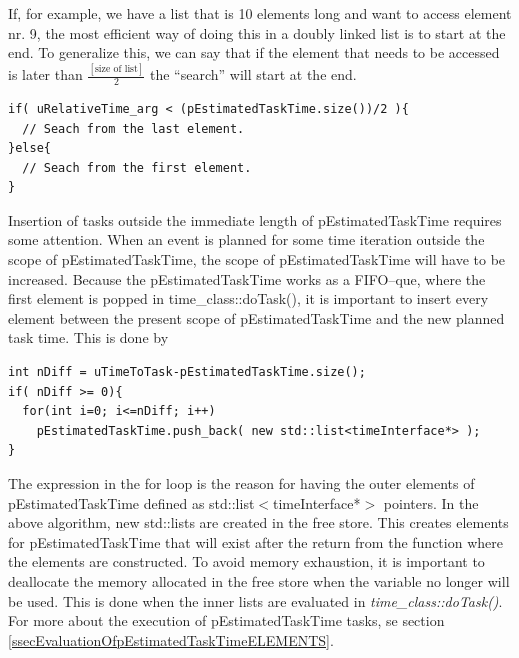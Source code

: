 	If, for example, we have a list that is 10 elements long and want to access element nr. 9, the most efficient way of doing this in a doubly linked list is to start at the end.
	To generalize this, we can say that if the element that needs to be accessed is later than $\frac{[\text{size of list}]}{2}$ the ``search'' will start at the end.

\begin{lstlisting}
if( uRelativeTime_arg < (pEstimatedTaskTime.size())/2 ){
  // Seach from the last element.
}else{
  // Seach from the first element.
}
\end{lstlisting}

	Insertion of tasks outside the immediate length of pEstimatedTaskTime requires some attention.
	When an event is planned for some time iteration outside the scope of pEstimatedTaskTime, the scope of pEstimatedTaskTime will have to be increased.
	Because the pEstimatedTaskTime works as a FIFO--que, where the first element %
		is popped in time\_class::doTask(), it is important to insert every element between the present scope of pEstimatedTaskTime and the new planned task time.
	This is done by
\begin{lstlisting}
int nDiff = uTimeToTask-pEstimatedTaskTime.size();
if( nDiff >= 0){
  for(int i=0; i<=nDiff; i++)
    pEstimatedTaskTime.push_back( new std::list<timeInterface*> );
}
\end{lstlisting}
The expression in the for loop is the reason for having the outer elements of pEstimatedTaskTime defined as std::list$<$timeInterface*$>$ pointers.
In the above algorithm, new std::lists are created in the free store. This creates elements for pEstimatedTaskTime that will exist after the return from the function where the elements are constructed.
To avoid memory exhaustion, it is important to deallocate the memory allocated in the free store when the variable no longer will be used. This is done when the inner lists are evaluated in \emph{time\_class::doTask()}.
For more about the execution of pEstimatedTaskTime tasks, se section \ref{ssecEvaluationOfpEstimatedTaskTimeELEMENTS}.


